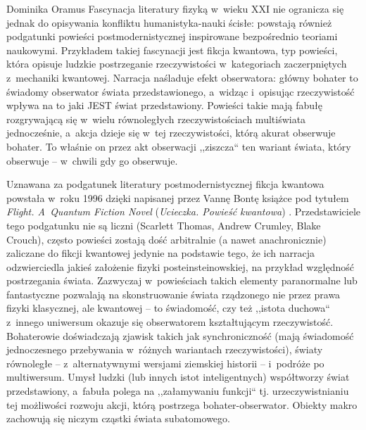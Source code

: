 \begin{artplenv}{Dominika Oramus}
Fascynacja literatury fizyką w~wieku XXI nie ogranicza się jednak do opisywania konfliktu humanistyka-nauki ścisłe: powstają również podgatunki powieści postmodernistycznej inspirowane bezpośrednio teoriami naukowymi. Przykładem takiej fascynacji jest fikcja kwantowa, typ powieści, która opisuje ludzkie postrzeganie rzeczywistości w~kategoriach zaczerpniętych z~mechaniki kwantowej. Narracja naśladuje efekt obserwatora: główny bohater to świadomy obserwator świata przedstawionego, a~widząc i~opisując rzeczywistość wpływa na to jaki JEST świat przedstawiony. Powieści takie mają fabułę rozgrywającą się w~wielu równoległych rzeczywistościach multiświata jednocześnie, a~akcja dzieje się w~tej rzeczywistości, którą akurat obserwuje bohater. To właśnie on przez akt obserwacji ,,ziszcza`` ten wariant świata, który obserwuje -- w~chwili gdy go obserwuje.

Uznawana za podgatunek literatury postmodernistycznej fikcja kwantowa powstała w~roku 1996 dzięki napisanej przez Vannę Bontę książce pod tytułem \textit{Flight. A~Quantum Fiction Novel} (\textit{Ucieczka. Powieść kwantowa})
\parencite*[][]{brockman_trzecia_1996}. %
 Przedstawiciele tego podgatunku nie są liczni (Scarlett Thomas, Andrew Crumley, Blake Crouch), często powieści zostają dość arbitralnie (a nawet anachronicznie) zaliczane do fikcji kwantowej jedynie na podstawie tego, że ich narracja odzwierciedla jakieś założenie fizyki posteinsteinowskiej, na przykład względność postrzegania świata. Zazwyczaj w~powieściach takich elementy paranormalne lub fantastyczne pozwalają na skonstruowanie świata rządzonego nie przez prawa fizyki klasycznej, ale kwantowej -- to świadomość, czy też ,,istota duchowa`` z~innego uniwersum okazuje się obserwatorem kształtującym rzeczywistość. Bohaterowie doświadczają zjawisk takich jak synchroniczność (mają świadomość jednoczesnego przebywania w~różnych wariantach rzeczywistości), światy równoległe -- z~alternatywnymi wersjami ziemskiej historii -- i~podróże po multiwersum. Umysł ludzki (lub innych istot inteligentnych) współtworzy świat przedstawiony, a~fabuła polega na ,,załamywaniu funkcji`` tj. urzeczywistnianiu tej możliwości rozwoju akcji, którą postrzega bohater-obserwator. Obiekty makro zachowują się niczym cząstki świata subatomowego.


\end{artplenv}
